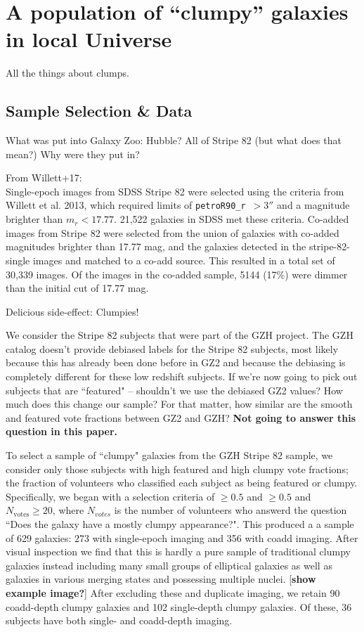 
\chapter{A population of ``clumpy'' galaxies in local Universe}
\label{chap:5}


All the things about clumps. 

\section{Sample Selection \& Data} 
\label{sec:style}
What was put into Galaxy Zoo: Hubble? All of Stripe 82 (but what does that mean?)
Why were they put in? 

From Willett+17: \\
Single-epoch images from SDSS Stripe 82 were selected using the criteria from Willett et al. 2013, 
which required limits of \texttt{petroR90\_r}~$ > 3''$ and a magnitude brighter than $m_r < 17.77$. 21,522 galaxies in SDSS met these criteria. Co-added images from Stripe 82 were selected from the union of galaxies with co-added magnitudes brighter than 17.77 mag, and the galaxies detected in the stripe-82-single images and matched to a co-add source. This resulted in a total set of 30,339 images. Of the images in the co-added sample, 5144 (17\%) were dimmer than the initial cut of 17.77  mag.


Delicious side-effect: Clumpies!

We consider the Stripe 82 subjects that were part of the GZH project.  
The GZH catalog doesn't provide debiased labels for the Stripe 82 subjects, most likely because this has already been done before in GZ2 and because the debiasing is completely different for these low redshift subjects. If we're now going to pick out subjects that are ``featured" -- shouldn't we use the debiased GZ2 values? How much does this change our sample? For that matter, how similar are the smooth and featured vote fractions between GZ2 and GZH? 
\textbf{Not going to answer this question in this paper.}



To select a sample of ``clumpy" galaxies from the GZH Stripe 82 sample, we consider only those subjects with  high featured and high clumpy vote fractions; the fraction of volunteers who classified each subject as being featured or clumpy. Specifically, we began with a selection criteria of \ffeat $\ge 0.5$ and  \fclump $\ge 0.5$ and $N_{\mathrm{votes}} \ge 20$, where $N_{votes}$ is the number of volunteers who answerd the question ``Does the galaxy have a mostly clumpy appearance?".  This produced a a sample of 629 galaxies: 273 with single-epoch imaging and 356 with coadd imaging. After visual inspection we find that this is hardly a pure sample of traditional clumpy galaxies instead including many small groups of elliptical galaxies as well as galaxies in various merging states and possessing multiple nuclei. [\textbf{show example image?}] After excluding these and duplicate imaging, we retain 90 coadd-depth clumpy galaxies and 102 single-depth clumpy galaxies. Of these, 36 subjects have both single- and coadd-depth imaging.

